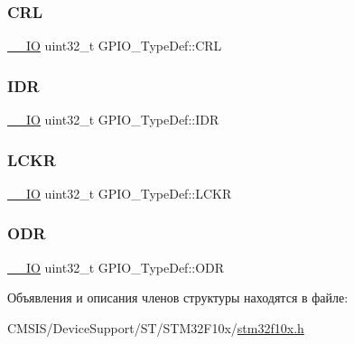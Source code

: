 \subsubsection{\texorpdfstring{CRL}{CRL}}
{\footnotesize\ttfamily \mbox{\hyperlink{group___c_m_s_i_s___c_m3__core__definitions_gaec43007d9998a0a0e01faede4133d6be}{\+\_\+\+\_\+\+IO}} uint32\+\_\+t G\+P\+I\+O\+\_\+\+Type\+Def\+::\+C\+RL}

\mbox{\label{struct_g_p_i_o___type_def_acf11156409414ad8841bb0b62959ee96}} 
\subsubsection{\texorpdfstring{IDR}{IDR}}
{\footnotesize\ttfamily \mbox{\hyperlink{group___c_m_s_i_s___c_m3__core__definitions_gaec43007d9998a0a0e01faede4133d6be}{\+\_\+\+\_\+\+IO}} uint32\+\_\+t G\+P\+I\+O\+\_\+\+Type\+Def\+::\+I\+DR}

\mbox{\label{struct_g_p_i_o___type_def_a95a59d4b1d52be521f3246028be32f3e}} 
\subsubsection{\texorpdfstring{LCKR}{LCKR}}
{\footnotesize\ttfamily \mbox{\hyperlink{group___c_m_s_i_s___c_m3__core__definitions_gaec43007d9998a0a0e01faede4133d6be}{\+\_\+\+\_\+\+IO}} uint32\+\_\+t G\+P\+I\+O\+\_\+\+Type\+Def\+::\+L\+C\+KR}

\mbox{\label{struct_g_p_i_o___type_def_a6fb78f4a978a36032cdeac93ac3c9c8b}} 
\subsubsection{\texorpdfstring{ODR}{ODR}}
{\footnotesize\ttfamily \mbox{\hyperlink{group___c_m_s_i_s___c_m3__core__definitions_gaec43007d9998a0a0e01faede4133d6be}{\+\_\+\+\_\+\+IO}} uint32\+\_\+t G\+P\+I\+O\+\_\+\+Type\+Def\+::\+O\+DR}



Объявления и описания членов структуры находятся в файле\+:\begin{DoxyCompactItemize}
\item 
C\+M\+S\+I\+S/\+Device\+Support/\+S\+T/\+S\+T\+M32\+F10x/\mbox{\hyperlink{stm32f10x_8h}{stm32f10x.\+h}}\end{DoxyCompactItemize}
